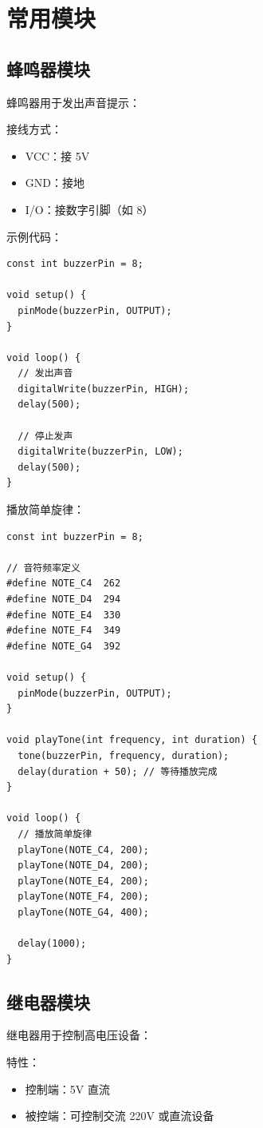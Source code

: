 \documentclass[12pt,UTF8]{ctexbook}
\begin{document}
\chapter{常用模块}

\section{蜂鸣器模块}

蜂鸣器用于发出声音提示：

接线方式：
\begin{itemize}
    \item VCC：接 5V
    \item GND：接地
    \item I/O：接数字引脚（如 8）
\end{itemize}

示例代码：
\begin{lstlisting}
const int buzzerPin = 8;

void setup() {
  pinMode(buzzerPin, OUTPUT);
}

void loop() {
  // 发出声音
  digitalWrite(buzzerPin, HIGH);
  delay(500);
  
  // 停止发声
  digitalWrite(buzzerPin, LOW);
  delay(500);
}
\end{lstlisting}

播放简单旋律：
\begin{lstlisting}
const int buzzerPin = 8;

// 音符频率定义
#define NOTE_C4  262
#define NOTE_D4  294
#define NOTE_E4  330
#define NOTE_F4  349
#define NOTE_G4  392

void setup() {
  pinMode(buzzerPin, OUTPUT);
}

void playTone(int frequency, int duration) {
  tone(buzzerPin, frequency, duration);
  delay(duration + 50); // 等待播放完成
}

void loop() {
  // 播放简单旋律
  playTone(NOTE_C4, 200);
  playTone(NOTE_D4, 200);
  playTone(NOTE_E4, 200);
  playTone(NOTE_F4, 200);
  playTone(NOTE_G4, 400);
  
  delay(1000);
}
\end{lstlisting}

\section{继电器模块}

继电器用于控制高电压设备：

特性：
\begin{itemize}
    \item 控制端：5V 直流
    \item 被控端：可控制交流 220V 或直流设备
\end{itemize}
\end{document}
